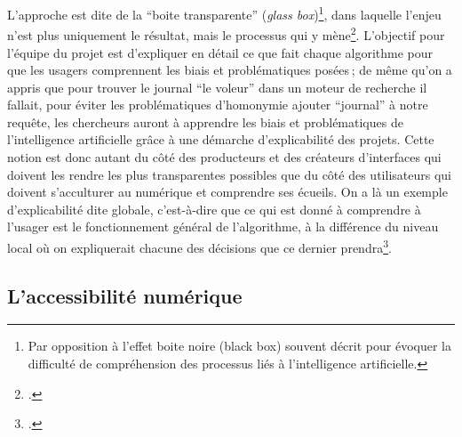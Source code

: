 L’approche est dite de la \enquote{boite transparente} (\textit{glass box})\footnote{Par opposition à l’effet boite noire (black box) souvent décrit pour évoquer la difficulté de compréhension des processus liés à l’intelligence artificielle.}, dans laquelle l’enjeu n’est plus uniquement le résultat, mais le processus qui y mène\footcite[p. 47]{besnehard_evaluer_nodate}. L’objectif pour l’équipe du projet est d’expliquer en détail ce que fait chaque algorithme pour que les usagers comprennent les biais et problématiques posées ; de même qu’on a appris que pour trouver le journal \enquote{le voleur} dans un moteur de recherche il fallait, pour éviter les problématiques d’homonymie ajouter \enquote{journal} à notre requête, les chercheurs auront à apprendre les biais et problématiques de l’intelligence artificielle grâce à une démarche d’explicabilité des projets. Cette notion est donc autant du côté des producteurs et des créateurs d’interfaces qui doivent les rendre les plus transparentes possibles que du côté des utilisateurs qui doivent s’acculturer au numérique et comprendre ses écueils. On a là un exemple d’explicabilité dite globale, c’est-à-dire que ce qui est donné à comprendre à l’usager est le fonctionnement général de l’algorithme, à la différence du niveau local où on expliquerait chacune des décisions que ce dernier prendra\footcite[p. 15]{maxwell_comment_2020}.

\subsection{L'accessibilité numérique}

